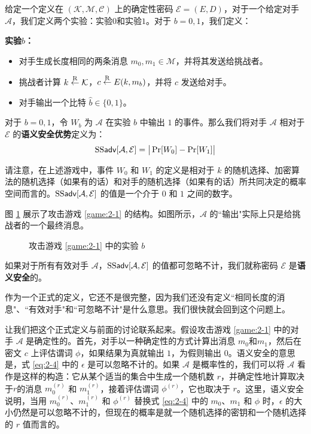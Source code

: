 \begin{game}[语义安全性]\label{game:2-1}
给定一个定义在 $(\mathcal{K},\mathcal{M},\mathcal{C})$ 上的确定性密码 $\mathcal{E}=(E,D)$，对于一个给定对手 $\mathcal{A}$，我们定义两个实验：实验$0$和实验$1$。对于 $b=0,1$，我们定义：

\noindent\textbf{实验$b$：}
\begin{itemize}
	\item 对手生成长度相同的两条消息 $m_0,m_1\in\mathcal{M}$，并将其发送给挑战者。
	\item 挑战者计算 $k\overset{\rm R}\leftarrow\mathcal{K}$，$c\overset{\rm R}\leftarrow E(k,m_b)$，并将 $c$ 发送给对手。
	\item 对手输出一个比特 $\hat b\in\{0,1\}$。
\end{itemize}

对于 $b=0,1$，令 $W_b$ 为 $\mathcal{A}$ 在实验 $b$ 中输出 $1$ 的事件。那么我们将对手 $\mathcal{A}$ 相对于 $\mathcal{E}$ 的\textbf{语义安全优势}定义为：
\[
{\rm SS\mathsf{adv}}[\mathcal{A},\mathcal{E}]=
\big\lvert
\Pr[W_0] -\Pr[W_1]
\big\rvert
\]
\end{game}

请注意，在上述游戏中，事件 $W_0$ 和 $W_1$ 的定义是相对于 $k$ 的随机选择、加密算法的随机选择（如果有的话）和对手的随机选择（如果有的话）所共同决定的概率空间而言的。${\rm SS\mathsf{adv}}[\mathcal{A},\mathcal{E}]$ 的值是一个介于 $0$ 和 $1$ 之间的数字。

图 \ref{fig:2-1} 展示了攻击游戏 \ref{game:2-1} 的结构。如图所示，$\mathcal{A}$ 的``输出"实际上只是给挑战者的一个最终消息。

\begin{figure}
	\centering
	
	\caption{攻击游戏 \ref{game:2-1} 中的实验 $b$}
	\label{fig:2-1}
\end{figure}

\begin{definition}[语义安全性]\label{def:2-2}
如果对于所有有效对手 $\mathcal{A}$，${\rm SS\mathsf{adv}}[\mathcal{A},\mathcal{E}]$ 的值都可忽略不计，我们就称密码 $\mathcal{E}$ 是\textbf{语义安全}的。
\end{definition}

作为一个正式的定义，它还不是很完整，因为我们还没有定义``相同长度的消息"、``有效对手"和``可忽略不计"是什么意思。我们很快就会回到这个问题上。

让我们把这个正式定义与前面的讨论联系起来。假设攻击游戏 \ref{game:2-1} 中的对手 $\mathcal{A}$ 是确定性的。首先，对手以一种确定性的方式计算出消息 $m_0$和$m_1$，然后在密文 $c$ 上评估谓词 $\phi$，如果结果为真就输出 $1$，为假则输出 $0$。语义安全的意思是，式 \ref{eq:2-4} 中的 $\epsilon$ 是可以忽略不计的。如果 $\mathcal{A}$ 是概率性的，我们可以将 $\mathcal{A}$ 看作是这样的构造：它从某个适当的集合中生成一个随机数 $r$，并确定性地计算取决于$r$的消息 $m^{(r)}_0$ 和 $m^{(r)}_1$，接着评估谓词 $\phi^{(r)}$，它也取决于 $r$。这里，语义安全说明，当用 $m^{(r)}_0$、$m^{(r)}_1$ 和 $\phi^{(r)}$ 替换式 \ref{eq:2-4} 中的 $m_0$、$m_1$ 和 $\phi$ 时，$\epsilon$ 的大小仍然是可以忽略不计的，但现在的概率是就一个随机选择的密钥和一个随机选择的 $r$ 值而言的。

